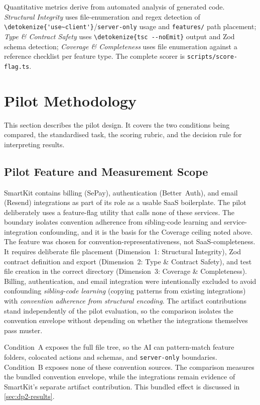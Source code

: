 \documentclass[12pt,a4paper]{report}
\newcommand{\code}[1]{\texttt{\nolinkurl{\detokenize{#1}}}}
\newcommand{\pkg}[1]{\texttt{\nolinkurl{#1}}}
\DeclareRobustCommand{\filename}[1]{\bgroup\urlstyle{tt}\nolinkurl{#1}\egroup}
\newcommand{\usec}{\code{'use~client'}}
\begin{document}
Quantitative metrics derive from automated analysis of generated code. \textit{Structural Integrity} uses file-enumeration and regex detection of \usec/\pkg{server-only} usage and \filename{features/} path placement; \textit{Type \& Contract Safety} uses \code{tsc --noEmit} output and Zod schema detection; \textit{Coverage \& Completeness} uses file enumeration against a reference checklist per feature type. The complete scorer is \filename{scripts/score-flag.ts}.

\section{Pilot Methodology}
\label{sec:pilot}
\label{sec:pilot-protocol}

This section describes the pilot design. It covers the two conditions being compared, the standardised task, the scoring rubric, and the decision rule for interpreting results.


\subsection{Pilot Feature and Measurement Scope}
\label{sec:integrations-and-pilot}

SmartKit contains billing (SePay), authentication (Better~Auth), and email (Resend) integrations as part of its role as a usable SaaS boilerplate. The pilot deliberately uses a feature-flag utility that calls none of these services. The boundary isolates convention adherence from sibling-code learning and service-integration confounding, and it is the basis for the Coverage ceiling noted above. The feature was chosen for convention-representativeness, not SaaS-completeness. It requires deliberate file placement (Dimension~1: Structural Integrity), Zod contract definition and export (Dimension~2: Type \& Contract Safety), and test file creation in the correct directory (Dimension~3: Coverage \& Completeness). Billing, authentication, and email integration were intentionally excluded to avoid confounding \emph{sibling-code learning} (copying patterns from existing integrations) with \emph{convention adherence from structural encoding}. The artifact contributions stand independently of the pilot evaluation, so the comparison isolates the convention envelope without depending on whether the integrations themselves pass muster.

Condition~A exposes the full file tree, so the AI can pattern-match feature folders, colocated actions and schemas, and \pkg{server-only} boundaries. Condition~B exposes none of these convention sources. The comparison measures the bundled convention envelope, while the integrations remain evidence of SmartKit's separate artifact contribution. This bundled effect is discussed in \autoref{sec:dp2-results}.
\end{document}
